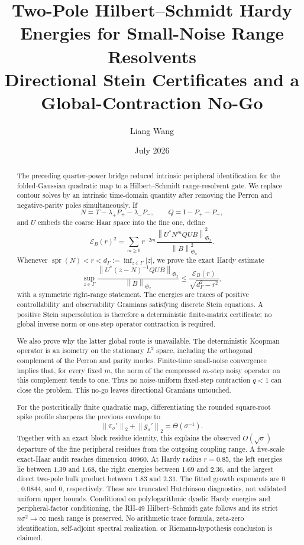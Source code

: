 \documentclass[11pt]{article}
\title{Two-Pole Hilbert--Schmidt Hardy Energies for Small-Noise Range Resolvents\\
\large Directional Stein Certificates and a Global-Contraction No-Go}
\author{Liang Wang}
\date{July 2026}
\theoremstyle{definition}
\theoremstyle{remark}
\newcommand{\Id}{\mathrm I}
\newcommand{\cE}{\mathcal E}
\newcommand{\HS}{\mathfrak S_2}
\newcommand{\spr}{\operatorname{spr}}
\newcommand{\norm}[1]{\left\lVert #1\right\rVert}
\begin{document}
\maketitle

\begin{abstract}
The preceding quarter-power bridge reduced intrinsic peripheral
identification for the folded-Gaussian quadratic map to a
Hilbert--Schmidt range-resolvent gate.  We replace contour solves by an
intrinsic time-domain quantity after removing the Perron and negative-parity
poles simultaneously.  If
\[
 N=T-\lambda_+P_+-\lambda_-P_-,
 \qquad Q=\Id-P_+-P_-,
\]
and \(U\) embeds the coarse Haar space into the fine one, define
\[
 \cE_B(r)^2
 =\sum_{m\ge0}r^{-2m}
 \frac{\norm{U^*N^mQUB}_{\HS}^2}{\norm B_{\HS}^2}.
\]
Whenever \(\spr(N)<r<d_\Gamma:=\inf_{z\in\Gamma}|z|\), we prove the exact
Hardy estimate
\[
 \sup_{z\in\Gamma}
 \frac{\norm{U^*(z-N)^{-1}QUB}_{\HS}}{\norm B_{\HS}}
 \le
 \frac{\cE_B(r)}{\sqrt{d_\Gamma^2-r^2}},
\]
with a symmetric right-range statement.  The energies are traces of
positive controllability and observability Gramians satisfying discrete
Stein equations.  A positive Stein supersolution is therefore a
deterministic finite-matrix certificate; no global inverse norm or
one-step operator contraction is required.

We also prove why the latter global route is unavailable.  The deterministic
Koopman operator is an isometry on the stationary \(L^2\) space, including
the orthogonal complement of the Perron and parity modes.  Finite-time
small-noise convergence implies that, for every fixed \(m\), the norm of the
compressed \(m\)-step noisy operator on this complement tends to one.
Thus no noise-uniform fixed-step contraction \(q<1\) can close the problem.
This no-go leaves directional Gramians untouched.

For the postcritically finite quadratic map, differentiating the rounded
square-root spike profile sharpens the previous envelope to
\[
 \norm{\pi_\sigma'}_2+\norm{g_\sigma'}_2
 =\Theta(\sigma^{-1}).
\]
Together with an exact block residue identity, this explains the observed
\(O(\sqrt{\sigma})\) departure of the fine peripheral residues from the
outgoing coupling range.  A five-scale exact-Haar audit reaches dimension
\(40960\).  At Hardy radius \(r=0.85\), the left energies lie between
\(1.39\) and \(1.68\), the right energies between \(1.69\) and \(2.36\),
and the largest direct two-pole bulk product between \(1.83\) and \(2.31\).
The fitted growth exponents are \(0\), \(0.0844\), and \(0\),
respectively.  These are truncated Hutchinson diagnostics, not validated
uniform upper bounds.  Conditional on polylogarithmic dyadic Hardy energies
and peripheral-factor conditioning, the RH-49 Hilbert--Schmidt gate follows
and its strict \(n\sigma^2\to\infty\) mesh range is preserved.  No
arithmetic trace formula, zeta-zero identification, self-adjoint spectral
realization, or Riemann-hypothesis conclusion is claimed.
\end{abstract}
\end{document}
